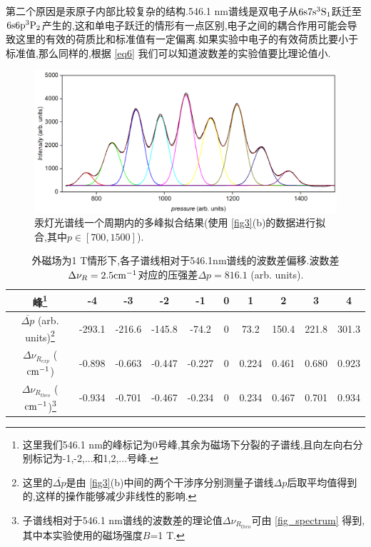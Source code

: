 \documentclass[font=default]{mpltx}
\begin{document}
第二个原因是汞原子内部比较复杂的结构.546.1 nm谱线是双电子从${\rm 6s7s^3S_1}$跃迁至${\rm 6s6p^3P_2}$产生的,这和单电子跃迁的情形有一点区别,电子之间的耦合作用可能会导致这里的有效的荷质比和标准值有一定偏离.如果实验中电子的有效荷质比要小于标准值,那么同样的,根据 \autoref{eq6} 我们可以知道波数差的实验值要比理论值小.
\begin{figure}
  \centering
  \includegraphics[width=0.78\linewidth]{fig/mul_peak_fit.png}
  \caption{汞灯光谱线一个周期内的多峰拟合结果(使用 \autoref{fig3}(b)的数据进行拟合,其中$p\in[700,1500]$).}
  \label{fig4}
\end{figure}

\begin{table}[h]
  \caption{外磁场为1 T情形下,各子谱线相对于546.1nm谱线的波数差偏移.波数差$\Delta\nu_{R}=2.5{\rm cm^{-1}}$对应的压强差$\Delta p=816.1$ (arb. units).}
  \label{tab1}
  \begin{ruledtabular}
    \begin{tabular}{cccccccccc}
      峰\footnote{这里我们546.1 nm的峰标记为0号峰,其余为磁场下分裂的子谱线,且向左向右分别标记为-1,-2,...和1,2,...号峰.} & -4 & -3 & -2  & -1 & 0 & 1  & 2  & 3  &4  \\ \hline
      $\overline{\Delta p}$ (arb. units)\footnote{这里的$\overline{\Delta p}$是由 \autoref{fig3}(b)中间的两个干涉序分别测量子谱线$\Delta p$后取平均值得到的,这样的操作能够减少非线性的影响.}& -293.1 & -216.6 & -145.8 & -74.2  & 0 & 73.2  & 150.4 & 221.8 & 301.3 \\ \hline
      $\Delta\nu_{R_{exp}}$ (${\rm cm^{-1}}$) & -0.898 & -0.663 & -0.447 & -0.227 & 0 & 0.224 & 0.461 & 0.680 & 0.923 \\ \hline
      $\Delta\nu_{R_{theo}}$ (${\rm cm^{-1}}$)\footnote{子谱线相对于546.1 nm谱线的波数差的理论值$\Delta\nu_{R_{theo}}$可由 \autoref{fig_spectrum} 得到,其中本实验使用的磁场强度$B$=1 T.} & -0.934 & -0.701 & -0.467 & -0.234 & 0 & 0.234 & 0.467 & 0.701 & 0.934 \\
    \end{tabular}
  \end{ruledtabular}
\end{table}
\end{document}

